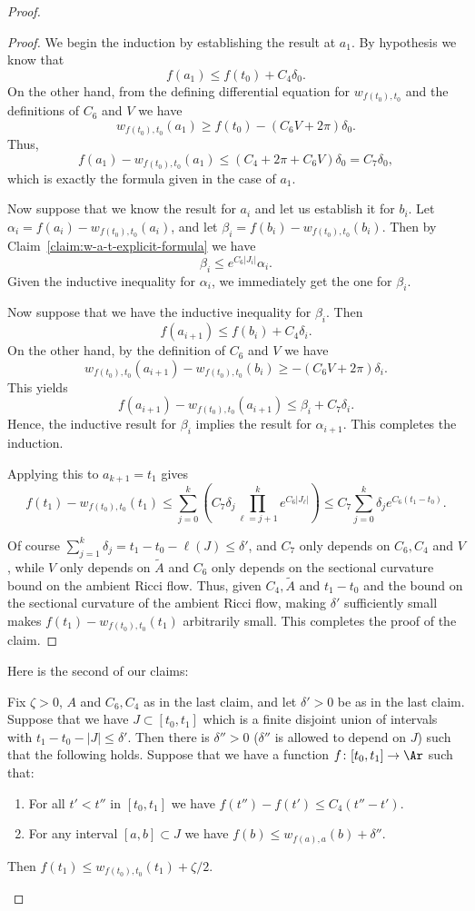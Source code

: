 \begin{proof}
\begin{proof}
We begin the induction by establishing the result at $a_1$. By
hypothesis we know that
$$f(a_1)\le f(t_0)+C_4\delta_0.$$
 On the other
hand, from the defining differential equation for $w_{f(t_0),t_0}$
and the definitions of $C_6$ and $V$ we have
$$w_{f(t_0),t_0}(a_1)\ge f(t_0) -(C_6V+2\pi)\delta_0.$$
Thus,
$$f(a_1)-w_{f(t_0),t_0}(a_1)\le (C_4+2\pi+C_6V)\delta_0=C_7\delta_0,$$
which is exactly the formula given in the case of $a_1$.

Now suppose that we know the result for $a_i$ and let us establish
it for $b_i$. Let $\alpha_i=f(a_i)-w_{f(t_0),t_0}(a_i)$, and let
$\beta_i=f(b_i)-w_{f(t_0),t_0}(b_i)$. Then by Claim~\ref{claim:w-a-t-explicit-formula} we
have
$$\beta_i\le e^{C_6|J_i|}\alpha_i.$$
Given the inductive inequality for $\alpha_i$, we immediately get
the one for $\beta_i$.

Now suppose that we have the inductive inequality for $\beta_i$.
Then
$$f(a_{i+1})\le f(b_i)+C_4\delta_i.$$
 On the other hand, by
 the definition of $C_6$ and $V$ we have
$$w_{f(t_0),t_0}(a_{i+1})-w_{f(t_0),t_0}(b_i)\ge
-(C_6V+2\pi)\delta_{i}.$$ This yields
$$f(a_{i+1})-w_{f(t_0),t_0}(a_{i+1})\le \beta_i+C_7\delta_i.$$
Hence, the inductive result for $\beta_i$ implies the result for
$\alpha_{i+1}$. This completes the induction.

Applying this to $a_{k+1}=t_1$ gives
$$f(t_1)-w_{f(t_0),t_0}(t_1)\le
\sum_{j=0}^k\left(C_7\delta_j\prod_{\ell=j+1}^{k}e^{
C_6|J_\ell|}\right)\le C_7\sum_{j=0}^k\delta_je^{C_6(t_1-t_0)}.$$

Of course $\sum_{j=1}^k\delta_j=t_1-t_0-\ell(J)\le\delta'$, and
$C_7$ only depends on $ C_6,C_4$ and $V$, while $V$  only depends on
$\widetilde A$ and $C_6$ only depends on the sectional curvature
bound on the ambient Ricci flow. Thus, given $C_4, \widetilde A$ and
$t_1-t_0$ and the bound on the sectional curvature of the ambient
Ricci flow, making $\delta'$ sufficiently small makes
$f(t_1)-w_{f(t_0),t_0}(t_1)$ arbitrarily small. This completes the
proof of the claim.
\end{proof}

Here is the second of our claims:

\begin{claim}
\label{claim:approximate-piecewise-domination-estimate}
\label{deltaprime}
Fix $\zeta>0$, $A$ and $C_6, C_4$ as in the last claim, and let
$\delta'>0$ be as in the last claim. Suppose that we have $J\subset
[t_0,t_1]$ which is a finite disjoint union of intervals with
$t_1-t_0-|J|\le \delta'$.
 Then there
is $\delta''>0$ ($\delta''$ is allowed to depend on $J$) such that
the following holds. Suppose that we have a function $f\colon
[t_0,t_1]\to \Ar$ such that:
\begin{enumerate}
\item[(1)] For all $t'<t''$ in $[t_0,t_1]$ we have $f(t'')-f(t')\le
C_4(t''-t')$.
\item[(2)] For any interval $[a,b]\subset J$ we have
$f(b)\le w_{f(a),a}(b)+\delta''$.
\end{enumerate}
Then $f(t_1)\le w_{f(t_0),t_0}(t_1)+\zeta/2$.
\end{claim}


\end{proof}
